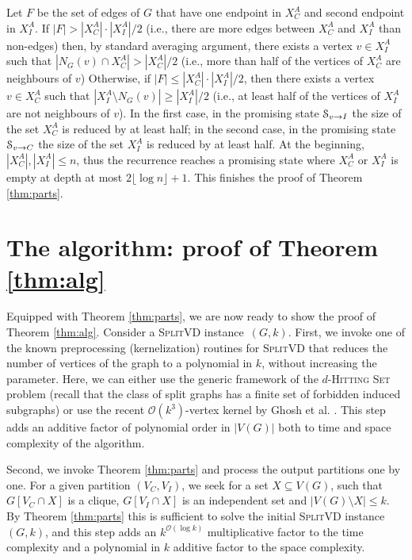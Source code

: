 \documentclass{article}
\newcommand{\Oh}{\ensuremath{\mathcal{O}}}
\newcommand{\splitvd}{\textsc{SplitVD}\xspace}
\theoremstyle{definition}
\begin{document}
Let $F$ be the set of edges of $G$
that have one endpoint in $X_C^A$ and second endpoint in $X_I^A$. If $|F| > |X_C^A| \cdot |X_I^A| / 2$
(i.e., there are more edges between $X_C^A$ and $X_I^A$ than non-edges) then,
by standard averaging argument, there exists a vertex $v \in X_I^A$ such that $|N_G(v) \cap X_C^A| > |X_C^A|/2$ (i.e., more than
 half of the vertices of $X_C^A$ are neighbours of $v$)
Otherwise, if $|F| \leq |X_C^A| \cdot |X_I^A| / 2$, then there exists a vertex $v \in X_C^A$ such that $|X_I^A \setminus N_G(v)| \geq |X_I^A|/2$
(i.e., at least half of the vertices of $X_I^A$ are not neighbours of $v$).
In the first case, in the promising state $\mathcal{S}_{v \to I}$ the size of the set $X_C^A$ is reduced by at least half; in the second case,
in the promising state $\mathcal{S}_{v \to C}$ the size of the set $X_I^A$ is reduced by at least half. 
At the beginning, $|X_C^A|,|X_I^A| \leq n$, thus the recurrence reaches a promising state where $X_C^A$ or $X_I^A$ is empty at depth
at most $2 \lfloor \log n \rfloor +1$. This finishes the proof of Theorem \ref{thm:parts}.

\section{The algorithm: proof of Theorem \ref{thm:alg}}\label{sec:alg}
\label{sec:proof-1.1}

Equipped with Theorem \ref{thm:parts}, we are now ready to show the proof of Theorem \ref{thm:alg}.
  Consider a \splitvd instance~$(G,k)$.
First, we invoke one of the known preprocessing (kernelization) routines for \splitvd that reduces the number of vertices of the graph to a polynomial in $k$, without increasing the parameter.
Here, we can either use the generic framework of the $d$-\textsc{Hitting Set} problem \cite{hitting-set}
(recall that the class of split graphs has a finite set of forbidden induced subgraphs)
or use the recent $\Oh(k^3)$-vertex kernel by Ghosh et al. \cite{ashutosh}.
This step adds an additive factor of polynomial order in $|V(G)|$ both to time and space complexity of the algorithm.

Second, we invoke Theorem \ref{thm:parts} and process the output partitions one by one.
For a given partition $(V_C,V_I)$, we seek for a set $X \subseteq V(G)$, such that $G[V_C \cap X]$ is a clique,
$G[V_I \cap X]$ is an independent set and $|V(G) \setminus X| \leq k$.
By Theorem \ref{thm:parts} this is sufficient to solve the initial \splitvd instance $(G,k)$,
and this step adds an $k^{\Oh(\log k)}$ multiplicative factor to the time complexity and
a polynomial in $k$ additive factor to the space complexity.
\end{document}
